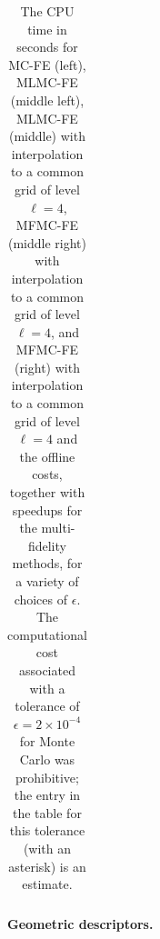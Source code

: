 \begin{table}[ht]
{\begin{tabular}{c|c|c|c|c|c|c|c|c|c|c|c|c|}
			\hline
	\end{tabular}
 }
	\caption{The CPU time in seconds for MC-FE (left), MLMC-FE (middle left), MLMC-FE (middle) with interpolation to a common grid of level $\ell=4$, MFMC-FE (middle right) with interpolation to a common grid of level $\ell=4$,  and MFMC-FE (right) with interpolation to a common grid of level $\ell=4$ and the offline costs, together with speedups for the multi-fidelity methods, for a variety of choices of $\epsilon$. The computational cost associated with a tolerance of $\epsilon = 2\times 10^{-4}$ for Monte Carlo was prohibitive; the entry in the table for this tolerance (with an asterisk) is an estimate.}
	\label{Tab:CPU_time}
\end{table}
%




\noindent \textbf{Geometric descriptors.}
%
\begin{table}[ht]
	\centering
	\caption{Geometric parameters of the expected poloidal flux $u$ from MC-FE with direct solver, MLMC-FE with direct solver,  MLMC-FE with direct solver with interpolating solution to a common fine grid of level $L=5$, MFMC-FE with surrogate with interpolating solution to a common fine grid of level $L=5$. The results are generated with an nMSE $4\times 10^{-4}$ on the geometry-conforming uniform mesh set.}
	\label{Tab: QoI_GeoInfo}
\end{table}






